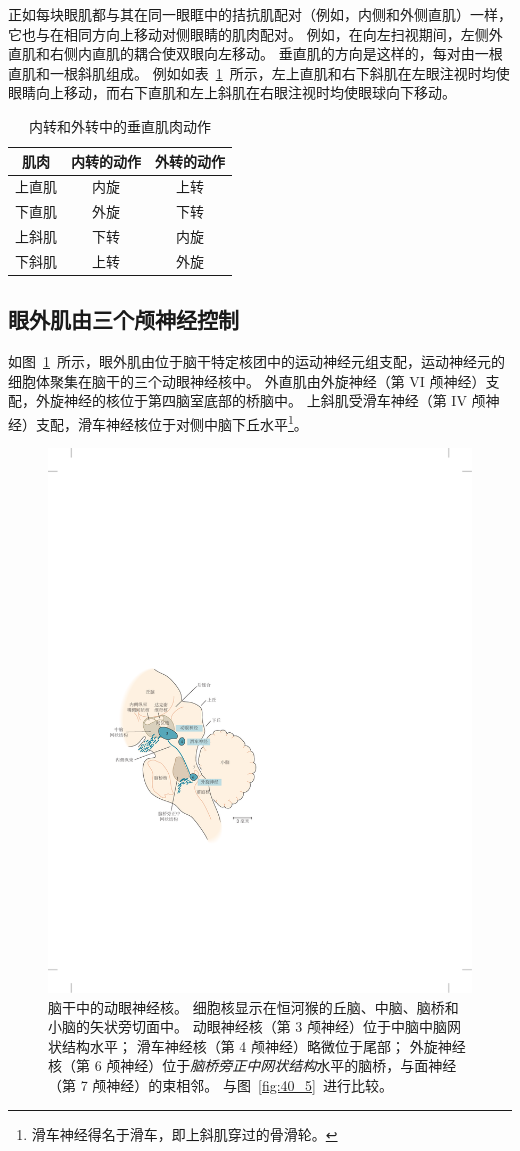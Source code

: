 正如每块眼肌都与其在同一眼眶中的拮抗肌配对（例如，内侧和外侧直肌）一样，它也与在相同方向上移动对侧眼睛的肌肉配对。
例如，在向左扫视期间，左侧外直肌和右侧内直肌的耦合使双眼向左移动。
垂直肌的方向是这样的，每对由一根直肌和一根斜肌组成。
例如如表~\ref{tab:35_1}~所示，左上直肌和右下斜肌在左眼注视时均使眼睛向上移动，而右下直肌和左上斜肌在右眼注视时均使眼球向下移动。


\begin{table}[htbp]
	\caption{内转和外转中的垂直肌肉动作\label{tab:35_1}}
	\centering
	\begin{tabular}{ccc}
		\toprule
		肌肉 & 内转的动作 
		& 外转的动作 \\
		\midrule
		上直肌 & 内旋  & 上转 \\
		下直肌      & 外旋 	& 下转 \\
		上斜肌      & 下转 	& 内旋 \\
		下斜肌      & 上转 	& 外旋 \\
		\bottomrule
	\end{tabular}
\end{table}



\subsection{眼外肌由三个颅神经控制}

如图~\ref{fig:35_3}~所示，眼外肌由位于脑干特定核团中的运动神经元组支配，运动神经元的细胞体聚集在脑干的三个动眼神经核中。
外直肌由外旋神经（第 VI 颅神经）支配，外旋神经的核位于第四脑室底部的桥脑中。
上斜肌受滑车神经（第 IV 颅神经）支配，滑车神经核位于对侧中脑下丘水平\footnote{滑车神经得名于滑车，即上斜肌穿过的骨滑轮。}。


\begin{figure}[htbp]
	\centering
	\includegraphics[width=0.62\linewidth]{chap35/fig_35_3}
	\caption{脑干中的动眼神经核。
		细胞核显示在恒河猴的丘脑、中脑、脑桥和小脑的矢状旁切面中。
		动眼神经核（第 3 颅神经）位于中脑中脑网状结构水平；
		滑车神经核（第 4 颅神经）略微位于尾部；
		外旋神经核（第 6 颅神经）位于\textit{脑桥旁正中网状结构}水平的脑桥，与面神经（第 7 颅神经）的束相邻\cite{henn1982primate}。 
		与图~\ref{fig:40_5}~进行比较。}
	\label{fig:35_3}
\end{figure}


